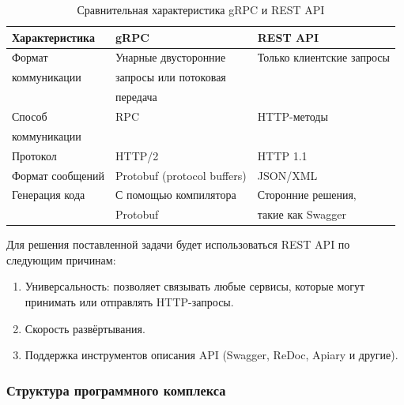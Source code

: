 \begin{table}[h]
	\begin{center}
		\captionsetup{justification=RaggedRight, singlelinecheck=off}
		\caption{Сравнительная характеристика gRPC и REST API}
		\label{tbl:compare}
		\begin{tabular}{|l|l|l|}
			\hline
			Характеристика & gRPC & REST API \\
			\hline
			Формат & Унарные двусторонние & Только клиентские запросы \\
			коммуникации & запросы или потоковая & \\
			 & передача & \\
			\hline
			Способ & RPC & HTTP-методы \\
			коммуникации & & \\
			\hline
			Протокол & HTTP/2 & HTTP 1.1 \\
			\hline
			Формат сообщений & Protobuf (protocol buffers) & JSON/XML \\
			\hline
			Генерация кода & С помощью компилятора & Сторонние решения, \\
			& Protobuf & такие как Swagger \cite{Swagger} \\
			\hline
		\end{tabular}
	\end{center}
\end{table}

Для решения поставленной задачи будет использоваться REST API по следующим причинам:

\begin{enumerate}[label*=\arabic*.]
	\item Универсальность: позволяет связывать любые сервисы, которые могут принимать или отправлять HTTP-запросы.
	\item Скорость развёртывания.
	\item Поддержка инструментов описания API (Swagger, ReDoc, Apiary и другие).
	
\end{enumerate}




\subsubsection{Структура программного комплекса}

